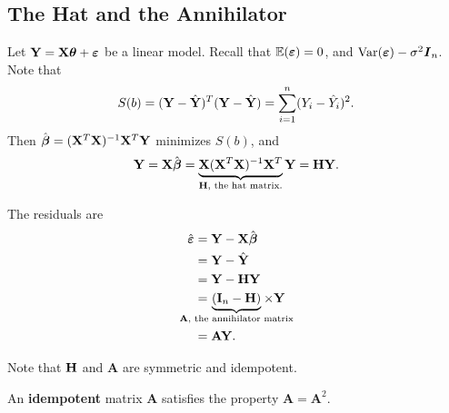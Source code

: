 

\subsection{The Hat and the Annihilator}

Let $\mathbf Y=\mathbf X\boldsymbol \theta +\boldsymbol {\varepsilon}$ be a linear model. Recall that $\mathbb E({\boldsymbol{\varepsilon}})=0$, and $\operatorname*{Var}(\boldsymbol{\varepsilon})-\sigma^2\boldsymbol I_n$. Note that 
 \begin{align*}
	 S(b)=(\mathbf Y-\hat{\mathbf Y})^T(\mathbf Y-\hat{\mathbf Y})=\sum^n_{i=1}(Y_i-\hat{Y}_i)^2
.\end{align*}
Then $\hat{\boldsymbol{{\beta}}}=(\mathbf X^T\mathbf X)^{-1}\mathbf X^T\mathbf Y$ minimizes $S(b)$, and
$$\mathbf Y=\mathbf X\hat{\boldsymbol{{\beta}}}=\underbrace{\mathbf X(\mathbf X^T\mathbf X)^{-1}\mathbf X^T}_{\mathbf{H}, \text{ the hat matrix.}}\mathbf Y=\mathbf {H}\mathbf Y.$$

The residuals are
\begin{align*}
		\hat{\boldsymbol{{\epsilon}}}&=\YY-\XX\hat{\boldsymbol{{\beta}}}\\
									 &=\YY-\hat{\YY}\\
									 &=\YY-\mathbf{H}\YY \\
									 &=\hspace{-2.5em}\underbrace{(\mathbf I_n-\mathbf{H})}_{\mathbf A,\text{ the annihilator matrix}} \hspace{-2.5em}\times \YY\\ 
									 &=\mathbf A \YY
.\end{align*} 

Note that $\mathbf H$ and $\mathbf A$ are symmetric and idempotent.

\begin{definition}
	An \textbf{idempotent} matrix $\mathbf A$ satisfies the property $\mathbf A=\mathbf A^2$. 
\end{definition}


